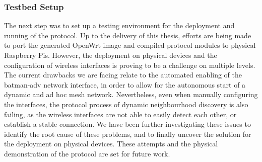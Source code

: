 \subsubsection{Testbed Setup} \label{sec:infrastructure:testbed}


The next step was to set up a testing environment for the deployment and running of the \pol{} protocol. Up to the delivery of this thesis, efforts are being made to port the generated OpenWrt image and compiled protocol modules to physical Raspberry Pis. However, the deployment on physical devices and the configuration of wireless interfaces is proving to be a challenge on multiple levels. The current drawbacks we are facing relate to the automated enabling of the batman-adv network interface, in order to allow for the autonomous start of a dynamic and ad hoc mesh network. Nevertheless, even when manually configuring the interfaces, the protocol process of dynamic neighbourhood discovery is also failing, as the wireless interfaces are not able to easily detect each other, or establish a stable connection. We have been further investigating these issues to identify the root cause of these problems, and to finally uncover the solution for the deployment on physical devices. These attempts and the physical demonstration of the \pol{} protocol are set for future work.


